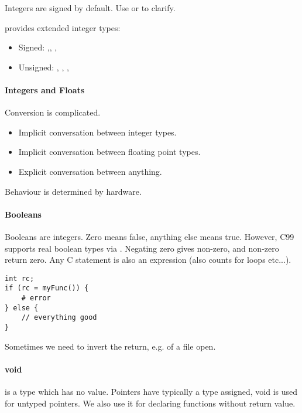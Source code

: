 Integers are signed by default. Use  or  to clarify.

 provides extended integer types:
\begin{itemize}
    \item Signed: ,, , 
    \item Unsigned: , , , 
\end{itemize}

\paragraph{Integers and Floats}
Conversion is complicated.
\begin{itemize}
    \item Implicit conversation between integer types.
    \item Implicit conversation between floating point types.
    \item Explicit conversation between anything.
\end{itemize}
Behaviour is determined by hardware.

\paragraph{Booleans}
Booleans are integers. Zero means false, anything else means true. However, C99 supports real boolean types via . Negating zero gives non-zero, and non-zero return zero.
Any C statement is also an expression (also counts for loops etc...).
\begin{lstlisting}
int rc;
if (rc = myFunc()) {
    # error
} else {
    // everything good
}
\end{lstlisting}

Sometimes we need to invert the return, e.g. of a file open.

\paragraph{void}
 is a type which has no value. Pointers have typically a type assigned, void is used for untyped pointers. We also use it for declaring functions without return value.


